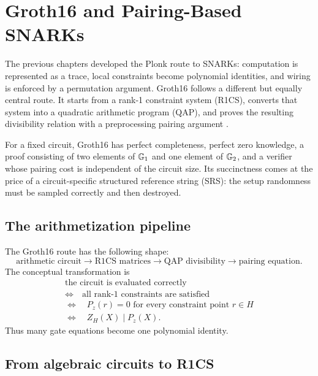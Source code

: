\section{Groth16 and Pairing-Based SNARKs}
\label{sec:groth16}

The previous chapters developed the Plonk route to SNARKs: computation is represented as a trace, local constraints become polynomial identities, and wiring is enforced by a permutation argument. Groth16 follows a different but equally central route. It starts from a rank-1 constraint system (R1CS), converts that system into a quadratic arithmetic program (QAP), and proves the resulting divisibility relation with a preprocessing pairing argument \cite{GennaroGentryParnoRaykova2013,ParnoHowellGentryRaykova2013,Groth2016}.

For a fixed circuit, Groth16 has perfect completeness, perfect zero knowledge, a proof consisting of two elements of $\mathbb{G}_1$ and one element of $\mathbb{G}_2$, and a verifier whose pairing cost is independent of the circuit size. Its succinctness comes at the price of a circuit-specific structured reference string (SRS): the setup randomness must be sampled correctly and then destroyed.

\subsection{The arithmetization pipeline}

The Groth16 route has the following shape:
\[
\boxed{
\text{arithmetic circuit}
\longrightarrow
\text{R1CS matrices}
\longrightarrow
\text{QAP divisibility}
\longrightarrow
\text{pairing equation}
}.
\]
The conceptual transformation is
\[
\begin{array}{c}
\text{the circuit is evaluated correctly}\\[0.2em]
\Longleftrightarrow\quad \text{all rank-1 constraints are satisfied}\\[0.2em]
\Longleftrightarrow\quad P_z(r)=0\text{ for every constraint point }r\in H\\[0.2em]
\Longleftrightarrow\quad Z_H(X)\mid P_z(X).
\end{array}
\]
Thus many gate equations become one polynomial identity.

\subsection{From algebraic circuits to R1CS}

